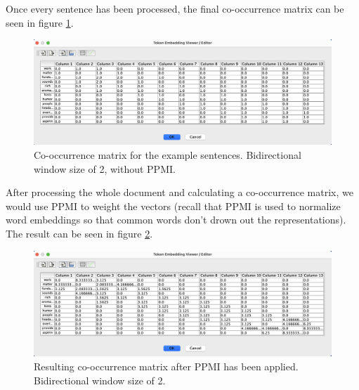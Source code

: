 Once every sentence has been processed, the final co-occurrence matrix can be seen in figure \ref{coocExample}.

\begin{figure}[h]
    \centering
    \includegraphics[scale=0.4]{./images/full_cooc_matrix.png}
    \caption[Generated using Simbrain.]{Co-occurrence matrix for the example sentences. Bidirectional window size of 2, without PPMI.}
 \label{coocExample}
\end{figure}

After processing the whole document and calculating a co-occurrence matrix, we would use PPMI to weight the vectors (recall that PPMI is used to normalize word embeddings so that common words don't drown out the representations). The result can be seen in figure \ref{ppmiExample}.

\begin{figure}[h]
    \centering
    \includegraphics[scale=0.4]{./images/weighted_cooc_matrix.png}
    \caption[Generated using Simbrain.]{Resulting co-occurrence matrix after PPMI has been applied. Bidirectional window size of 2.}
 \label{ppmiExample}
\end{figure}